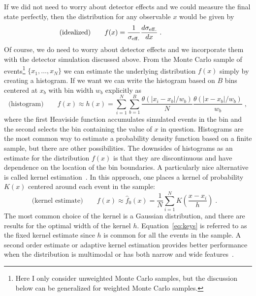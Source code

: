 \documentclass{cernrep}
\begin{document}
If we did not need to worry about detector effects and we could measure the final state perfectly, then the distribution for any observable $x$ would be given by
\begin{equation}
\textrm{(idealized)}\hspace{2em}f(x) = \frac{1}{\sigma_{\rm eff.}} \frac{d\sigma_{\rm eff.}}{dx}\;.\hspace{5em}
\end{equation}
Of course, we do need to worry about detector effects and we incorporate them with the detector simulation discussed above.  From the Monte Carlo sample of events\footnote{Here I only consider unweighted Monte Carlo samples, but the discussion below can be generalized for weighted Monte Carlo samples.} $\{x_1, \dots, x_N\}$ we can estimate the underlying distribution $f(x)$ simply by creating a histogram.  If we want we can write the histogram based on $B$ bins centered at $x_b$ with bin width $w_b$ explicitly as
\begin{equation}
\textrm{(histogram)} \hspace{2em}f(x) \approx h(x) =  \sum_{i=1}^N \sum_{b=1}^B  \frac{ \theta(|x_i-x_b|/w_b) }{N} \frac{\theta(|x -x_b|/w_b)}{w_b}\;,  \end{equation}
where the first Heaviside function accumulates simulated events in the bin and the second selects the bin containing the value of $x$ in question.  Histograms are the most common way to estimate a probability density function based on a finite sample, but there are other possibilities.  The downsides of histograms as an estimate for the distribution $f(x)$ is that they are discontinuous and have dependence on the location of the bin boundaries.  A particularly nice alternative is called kernel estimation~\cite{Cranmer:2000du}.  In this approach, one places a kernel of probability $K(x)$ centered around each event in the sample:
\begin{equation}\label{eq:keys}
\textrm{(kernel estimate)}\hspace{2em}f(x) \approx \hat{f}_0(x) =  \frac{1}{N} \sum_{i=1}^N K\left( \frac{x-x_i}{h} \right)\;.\hspace{1em}
\end{equation}
The most common choice of the kernel is a Gaussian distribution, and there are results for the optimal width of the kernel $h$.  Equation~\ref{eq:keys} is referred to as the fixed kernel estimate since $h$ is common for all the events in the sample.  A second order estimate or adaptive kernel estimation provides better performance when the distribution is multimodal or has both narrow and wide features~\cite{Cranmer:2000du}.
\end{document}
